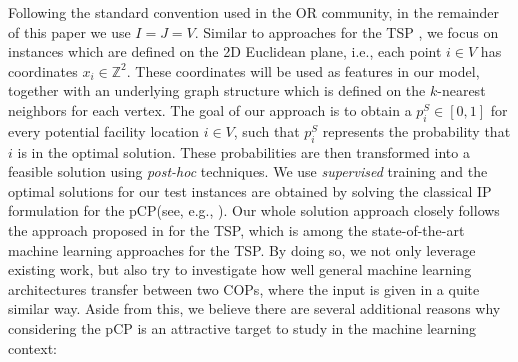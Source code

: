 \documentclass[]{article}
\newcommand{\loc}{J}
\newcommand{\cus}{I}
\newcommand{\PCP}{pCP\xspace}
\begin{document}
Following the standard convention used in the OR community, in the remainder of 
this paper we use $\cus=\loc=V$.
Similar to approaches for the TSP \cite{joshi2019efficient,joshi2020learning}, 
we focus on instances which are defined on the 2D Euclidean plane, i.e., each 
point $i \in V$ has coordinates $x_i\in \mathbb Z^2$. These coordinates will be 
used as features in our model, together with an underlying graph structure 
which is defined on the $k$-nearest neighbors for each vertex. The goal of our 
approach is to obtain a $p_i^S \in [0,1]$ for every potential facility 
location $i \in 
V$, 
such that $p_i^S$ represents the probability that $i$ is in 
the optimal solution.  These probabilities are then transformed into a 
feasible 
solution using \emph{post-hoc} techniques. We use \emph{supervised} training 
and 
the optimal solutions for our test instances are obtained by solving the 
classical IP formulation for the \PCP (see, e.g., \cite{laporte2019location}).
Our whole solution approach closely follows the approach proposed in 
\cite{joshi2019efficient,joshi2020learning} for the TSP, which is among the 
state-of-the-art machine learning approaches for the TSP. By doing so, we not 
only leverage existing work, but also try to investigate how well general 
machine learning architectures transfer between two COPs, where the input is 
given in a quite similar way. Aside from this, we believe there are several 
additional reasons why considering the \PCP is an attractive target to study in 
the machine learning context:
\end{document}
